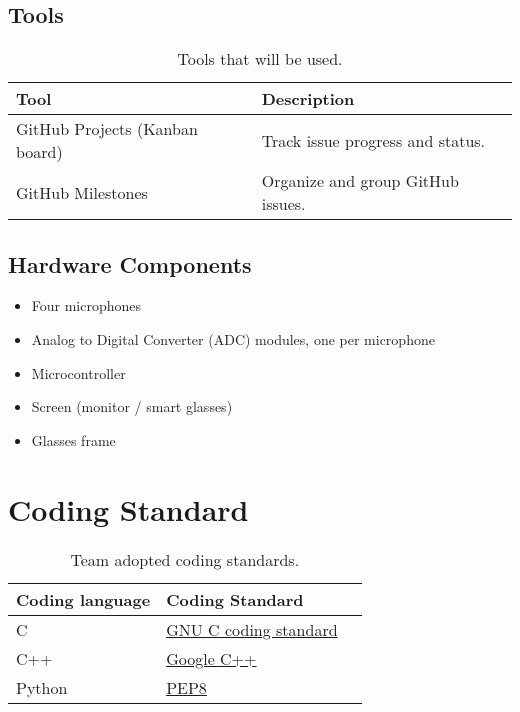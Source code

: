 \documentclass{article}
\begin{document}
\subsection{Tools}
\begin{table}[h!]
\centering
\begin{tabularx}{\textwidth}{|l|X|}
\hline
\textbf{Tool} & \textbf{Description} \\ \hline
GitHub Projects (Kanban board) & Track issue progress and status. \\ \hline
GitHub Milestones & Organize and group GitHub issues. \\ \hline
\end{tabularx}
\caption{Tools that will be used.}
\end{table}

\subsection{Hardware Components}
\begin{itemize}
  \item Four microphones
  \item Analog to Digital Converter (ADC) modules, one per microphone
  \item Microcontroller
  \item Screen (monitor / smart glasses)
  \item Glasses frame
\end{itemize}


\section{Coding Standard}\label{sec:coding_standards}

\begin{table}[h!]
\centering
\begin{tabularx}{\textwidth}{|l|X|X|}
\hline
\textbf{Coding language} & \textbf{Coding Standard} \\ \hline
C & \href{https://www.gnu.org/prep/standards/html_node/Writing-C.html}{GNU C coding standard} \\ \hline
C++ & \href{https://google.github.io/styleguide/cppguide.html}{Google C++} \\ \hline
Python & \href{https://peps.python.org/pep-0008/}{PEP8} \\ \hline
\end{tabularx}
\caption{Team adopted coding standards.}
\end{table}
\end{document}
